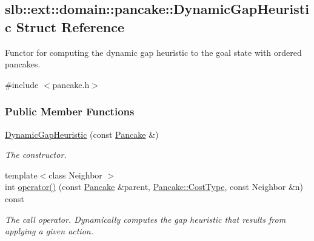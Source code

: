 \hypertarget{structslb_1_1ext_1_1domain_1_1pancake_1_1DynamicGapHeuristic}{}\subsection{slb\+:\+:ext\+:\+:domain\+:\+:pancake\+:\+:Dynamic\+Gap\+Heuristic Struct Reference}
\label{structslb_1_1ext_1_1domain_1_1pancake_1_1DynamicGapHeuristic}


Functor for computing the dynamic gap heuristic to the goal state with ordered pancakes.  




{\ttfamily \#include $<$pancake.\+h$>$}

\subsubsection*{Public Member Functions}
\begin{DoxyCompactItemize}
\item 
\hyperlink{structslb_1_1ext_1_1domain_1_1pancake_1_1DynamicGapHeuristic_a319fbfce78634255bb6b73a20a162fa7}{Dynamic\+Gap\+Heuristic} (const \hyperlink{structslb_1_1ext_1_1domain_1_1pancake_1_1Pancake}{Pancake} \&)\hypertarget{structslb_1_1ext_1_1domain_1_1pancake_1_1DynamicGapHeuristic_a319fbfce78634255bb6b73a20a162fa7}{}\label{structslb_1_1ext_1_1domain_1_1pancake_1_1DynamicGapHeuristic_a319fbfce78634255bb6b73a20a162fa7}

\begin{DoxyCompactList}\small\item\em The constructor. \end{DoxyCompactList}\item 
{\footnotesize template$<$class Neighbor $>$ }\\int \hyperlink{structslb_1_1ext_1_1domain_1_1pancake_1_1DynamicGapHeuristic_aa2f8656c3030bc740544f1e807fc46ae}{operator()} (const \hyperlink{structslb_1_1ext_1_1domain_1_1pancake_1_1Pancake}{Pancake} \&parent, \hyperlink{structslb_1_1ext_1_1domain_1_1pancake_1_1Pancake_a53aacc6af425f7650fdb94880b1c2572}{Pancake\+::\+Cost\+Type}, const Neighbor \&n) const 
\begin{DoxyCompactList}\small\item\em The call operator. Dynamically computes the gap heuristic that results from applying a given action. \end{DoxyCompactList}\end{DoxyCompactItemize}


